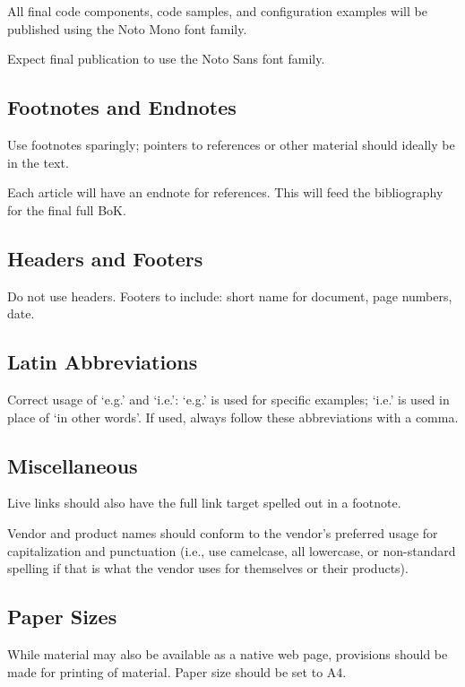 \documentclass[]{article}
\begin{document}
All final code components, code samples, and configuration examples will be published using the Noto Mono font family.

Expect final publication to use the Noto Sans font family.

\subsection{Footnotes and Endnotes}

Use footnotes sparingly; pointers to references or other material should ideally be in the text.

Each article will have an endnote for references. This will feed the bibliography for the final full BoK.

\subsection{Headers and Footers}

Do not use headers.
Footers to include: short name for document, page numbers, date.

\subsection{Latin Abbreviations}

Correct usage of ‘e.g.’ and ‘i.e.’: ‘e.g.’ is used for specific examples; ‘i.e.’ is used in place of ‘in other words’. If used, always follow these abbreviations with a comma.

\subsection{Miscellaneous}

Live links should also have the full link target spelled out in a footnote.

Vendor and product names should conform to the vendor’s preferred usage for capitalization and punctuation (i.e., use camelcase, all lowercase, or non-standard spelling if that is what the vendor uses for themselves or their products).

\subsection{Paper Sizes}

While material may also be available as a native web page, provisions should be made for printing of material.  Paper size should be set to A4.
\end{document}
